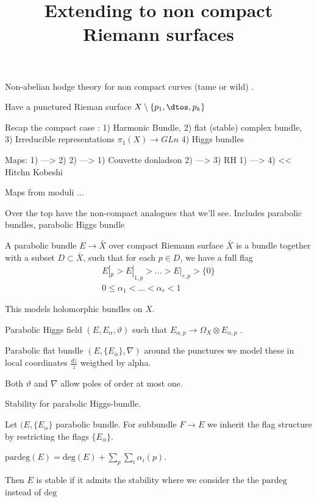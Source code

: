 % 



\title{Extending to non compact Riemann surfaces}
\author{}
\date{}

 
\maketitle
Non-abelian hodge theory for non compact curves (tame or wild) .

Have a punctured Rieman surface $ X \setminus \{ p_1 , \dtos, p_k \} $ 

Recap the compact case : 
1) Harmonic Bundle, 
2) flat (stable) complex bundle, 
3) Irreducible representations $ \pi_1(X) \rightarrow GLn $ 
4) Higgs bundles 

Maps: 
1) ---> 2)
2) ---> 1) Couvette donladson 
2) ---> 3) RH 
1) ---> 4) << Hitchn Kobeshi 


Maps from moduli ...

Over the top have the non-compact analogues that we'll see. 
Includes parabolic bundles, 
parabolic Higgs bundle 

\begin{definition}
    A parabolic bundle $ E \rightarrow \bar{X} $ over compact Riemann surface $ \bar{X}$ 
    is a bundle together with a subset $ D \subset \bar{X}$, 
    such that for each $p \in D$, we have a full flag 
    \begin{align}
        E|_p > E|_{1,p} > \dots > E|_{r , p } > \{ 0 \} \\
        0 \leq \alpha_ 1 < \dots < \alpha _r < 1
    \end{align}
\end{definition}

This models holomorphic bundles on $X$. 

Parabolic Higgs field $(E, E_\alpha , \vartheta) $ 
such that $ E_{\alpha , p } \rightarrow \Omega_X \otimes E_{\alpha, p} $ .

Parabolic flat bundle $(E, \{ E_\alpha \}, \nabla ) $ 
around the punctures we model these in local coordinates $ \frac{dz}{z} $ weigthed by alpha. 

Both $ \vartheta $ and $\nabla $ allow poles of order at most one. 

Stability for parabolic Higgs-bundle. 

\begin{definition}
    Let $ ( E, \{ E_\alpha \} $ parabolic bundle. 
    For subbundle $F \rightarrow  E $ we inherit the flag structure by restricting the flags $\{E_\alpha\} $.

    $\mathrm{pardeg}(E) = \mathrm{deg}(E) + \sum_p \sum_i \alpha_i(p) $. 
    
    Then $E$ is stable if it admits the stability where we consider the the $\mathrm{pardeg} $ instead of $\mathrm{deg}$ 
\end{definition}

